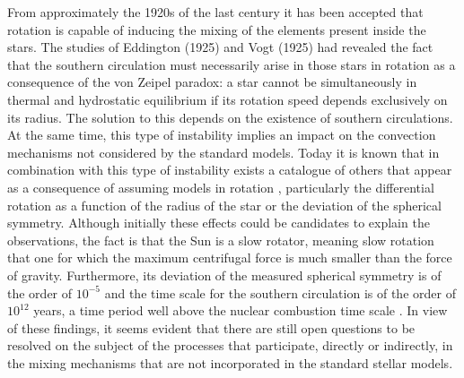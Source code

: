 \documentclass[fleqn,usenatbib]{mnras}
\begin{document}
From approximately the 1920s of the last century it has been accepted that rotation is capable of inducing the mixing of the elements present inside the stars. The studies of Eddington (1925) and Vogt (1925) had revealed the fact that the southern circulation must necessarily arise in those stars in rotation as a consequence of the von Zeipel paradox: a star cannot be simultaneously in thermal and hydrostatic equilibrium if its rotation speed depends exclusively on its radius. The solution to this depends on the existence of southern circulations. At the same time, this type of instability implies an impact on the convection mechanisms not considered by the standard models. Today it is known that in combination with this type of instability exists a catalogue of others that appear as a consequence of assuming models in rotation \citep{Maeder2003a}, particularly the differential rotation as a function of the radius of the star or the deviation of the spherical symmetry. Although initially these effects could be candidates to explain the observations, the fact is that the Sun is a slow rotator, meaning slow rotation that one for which the maximum centrifugal force is much smaller than the force of gravity. Furthermore, its deviation of the measured spherical symmetry is of the order of $10^{-5}$ and the time scale for the southern circulation is of the order of $10^{12}$ years, a time period well above the nuclear combustion time scale \citep{Pinsonneault1997}. In view of these findings, it seems evident that there are still open questions to be resolved on the subject of the processes that participate, directly or indirectly, in the mixing mechanisms that are not incorporated in the standard stellar models.\par
\end{document}
